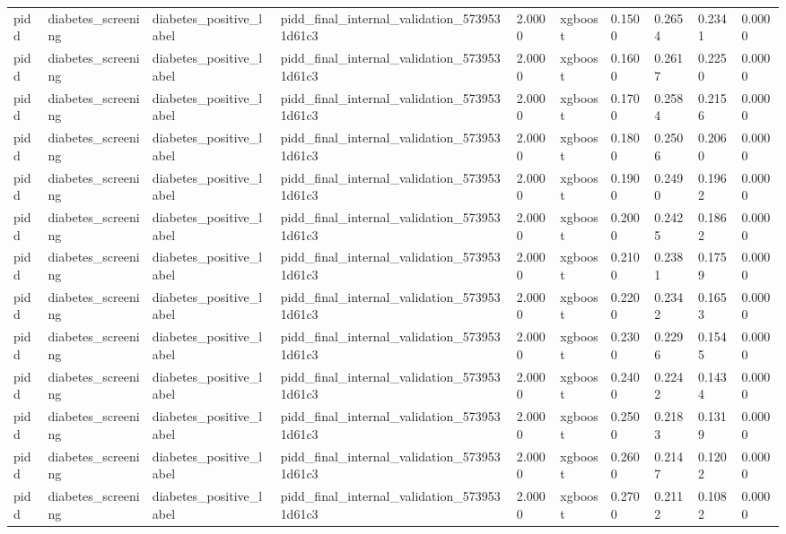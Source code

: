 \begin{tabular}{llllllllll}
pidd & diabetes\_screening & diabetes\_positive\_label & pidd\_final\_internal\_validation\_5739531d61c3 & 2.0000 & xgboost & 0.1500 & 0.2654 & 0.2341 & 0.0000 \\
pidd & diabetes\_screening & diabetes\_positive\_label & pidd\_final\_internal\_validation\_5739531d61c3 & 2.0000 & xgboost & 0.1600 & 0.2617 & 0.2250 & 0.0000 \\
pidd & diabetes\_screening & diabetes\_positive\_label & pidd\_final\_internal\_validation\_5739531d61c3 & 2.0000 & xgboost & 0.1700 & 0.2584 & 0.2156 & 0.0000 \\
pidd & diabetes\_screening & diabetes\_positive\_label & pidd\_final\_internal\_validation\_5739531d61c3 & 2.0000 & xgboost & 0.1800 & 0.2506 & 0.2060 & 0.0000 \\
pidd & diabetes\_screening & diabetes\_positive\_label & pidd\_final\_internal\_validation\_5739531d61c3 & 2.0000 & xgboost & 0.1900 & 0.2490 & 0.1962 & 0.0000 \\
pidd & diabetes\_screening & diabetes\_positive\_label & pidd\_final\_internal\_validation\_5739531d61c3 & 2.0000 & xgboost & 0.2000 & 0.2425 & 0.1862 & 0.0000 \\
pidd & diabetes\_screening & diabetes\_positive\_label & pidd\_final\_internal\_validation\_5739531d61c3 & 2.0000 & xgboost & 0.2100 & 0.2381 & 0.1759 & 0.0000 \\
pidd & diabetes\_screening & diabetes\_positive\_label & pidd\_final\_internal\_validation\_5739531d61c3 & 2.0000 & xgboost & 0.2200 & 0.2342 & 0.1653 & 0.0000 \\
pidd & diabetes\_screening & diabetes\_positive\_label & pidd\_final\_internal\_validation\_5739531d61c3 & 2.0000 & xgboost & 0.2300 & 0.2296 & 0.1545 & 0.0000 \\
pidd & diabetes\_screening & diabetes\_positive\_label & pidd\_final\_internal\_validation\_5739531d61c3 & 2.0000 & xgboost & 0.2400 & 0.2242 & 0.1434 & 0.0000 \\
pidd & diabetes\_screening & diabetes\_positive\_label & pidd\_final\_internal\_validation\_5739531d61c3 & 2.0000 & xgboost & 0.2500 & 0.2183 & 0.1319 & 0.0000 \\
pidd & diabetes\_screening & diabetes\_positive\_label & pidd\_final\_internal\_validation\_5739531d61c3 & 2.0000 & xgboost & 0.2600 & 0.2147 & 0.1202 & 0.0000 \\
pidd & diabetes\_screening & diabetes\_positive\_label & pidd\_final\_internal\_validation\_5739531d61c3 & 2.0000 & xgboost & 0.2700 & 0.2112 & 0.1082 & 0.0000 \\

\end{tabular}
